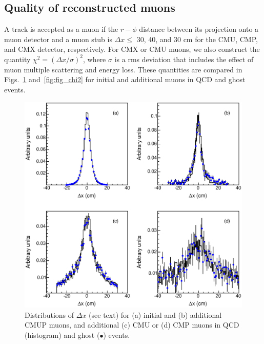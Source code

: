 \documentclass[aps,prd,preprint,floatfix,nofootinbib,superscriptaddress,showpacs,amssymb]{revtex4}
\begin{document}
 \subsection{Quality of reconstructed muons}
 A track is accepted as a muon if the $r-\phi$ distance between its 
 projection onto a muon detector and a muon stub is $\Delta x\leq$ 30,
 40, and 30 cm for the CMU, CMP, and CMX detector, respectively. For
 CMX or CMU muons, we also construct the quantity
 $\chi^2= (\Delta x /\sigma)^2$, where $\sigma$ is a rms deviation that
 includes the effect of muon multiple scattering and energy loss. These
 quantities are compared in Figs.~\ref{fig:fig_dx} and~\ref{fig:fig_chi2}
 for initial and additional muons in QCD and ghost events.
 \begin{figure}
 \begin{center}
 \vspace{-0.3in}
 \leavevmode
 \includegraphics*[width=\textwidth]{fa0_mudx.eps}
 \caption[]{Distributions of $\Delta x$ (see text) for (a) initial and (b)
            additional CMUP muons, and additional (c) CMU or (d) CMP muons
            in QCD (histogram) and ghost ($\bullet$) events.}
 \label{fig:fig_dx}
 \end{center}
 \end{figure}
\end{document}
